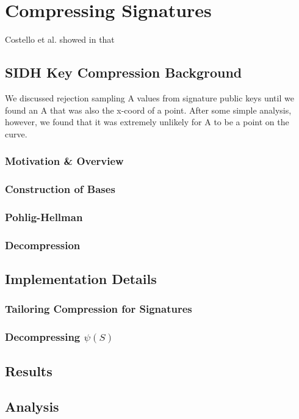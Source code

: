 \chapter{Compressing Signatures}
\label{sec:compress}

Costello et al. showed in \cite{pkcomp} that  

\section{SIDH Key Compression Background}

We discussed rejection sampling A values from signature public keys until we found an A that was also the x-coord of a point. After some simple analysis, however, we found that it was extremely unlikely for A to be a point on the curve.\\

\subsection{Motivation \& Overview}


\subsection{Construction of Bases}

\subsection{Pohlig-Hellman}

\subsection{Decompression}

\section{Implementation Details}

\subsection{Tailoring Compression for Signatures}

\subsection{Decompressing $\psi(S)$}

\section{Results}

\section{Analysis}

